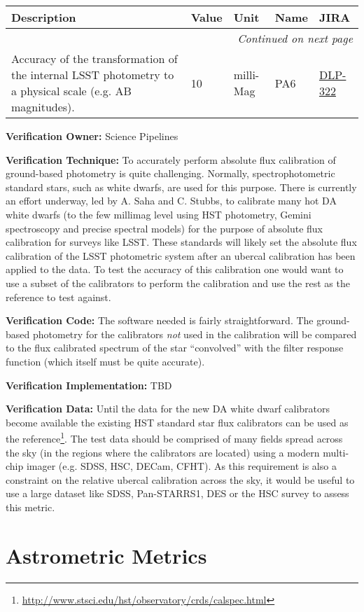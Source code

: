 \documentclass[DM,lsstdraft,toc]{lsstdoc}
\makeatletter
\newcommand{\jira}[1]{\href{https://jira.lsstcorp.org/browse/#1}{#1}}
\newenvironment{metric}[0]{%
\setlength\LTleft{0pt}
\setlength\LTright{\fill}
\begin{longtable}[]{@{}p{0.4\textwidth}lp{0.75in}p{1.3in}p{0.75in}@{}}

\hline \textbf{Description} & \textbf{Value} & \textbf{Unit} & \textbf{Name} & \textbf{JIRA} \\ \hline
\endhead

\hline \multicolumn{5}{r}{\emph{Continued on next page}} \\
\endfoot

\hline\hline
\endlastfoot
}{%
\hline
\end{longtable}
}
\makeatother
\begin{document}
\begin{metric}
Accuracy of the transformation of the internal LSST photometry to a
physical scale (e.g. AB magnitudes). & 10 & milli-Mag & PA6 &
\jira{DLP-322}\tabularnewline
\end{metric}

\textbf{Verification Owner:} Science Pipelines

\textbf{Verification Technique:} To accurately perform absolute flux
calibration of ground-based photometry is quite challenging. Normally,
spectrophotometric standard stars, such as white dwarfs, are used for
this purpose. There is currently an effort underway, led by A. Saha and
C. Stubbs, to calibrate many hot DA white dwarfs (to the few millimag
level using HST photometry, Gemini spectroscopy and precise spectral
models) for the purpose of absolute flux calibration for surveys like
LSST. These standards will likely set the absolute flux calibration of
the LSST photometric system after an ubercal calibration has been
applied to the data. To test the accuracy of this calibration one would
want to use a subset of the calibrators to perform the calibration and
use the rest as the reference to test against.

\textbf{Verification Code:} The software needed is fairly
straightforward. The ground-based photometry for the calibrators
\emph{not} used in the calibration will be compared to the flux
calibrated spectrum of the star ``convolved'' with the filter response
function (which itself must be quite accurate).

\textbf{Verification Implementation:} TBD

\textbf{Verification Data:} Until the data for the new DA white dwarf
calibrators become available the existing HST standard star flux
calibrators can be used as the reference\footnote{\url{http://www.stsci.edu/hst/observatory/crds/calspec.html}}.\protect\hypertarget{_Toc301352570}{}{}
The test data should be comprised of many fields spread across the sky
(in the regions where the calibrators are located) using a modern
multi-chip imager (e.g. SDSS, HSC, DECam, CFHT). As this requirement is
also a constraint on the relative ubercal calibration across the sky, it
would be useful to use a large dataset like SDSS, Pan-STARRS1, DES or
the HSC survey to assess this metric.

\section{Astrometric Metrics}\label{astrometric-metrics}
\end{document}
